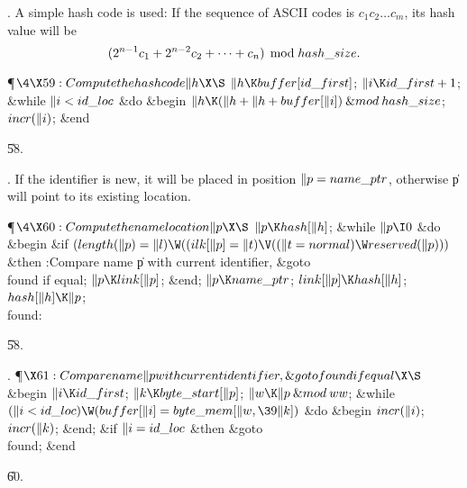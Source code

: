 . A simple hash code is used: If the sequence of
ASCII codes is $c_1c_2\ldots c_m$, its hash value will be
$$(2^{n-1}c_1+2^{n-2}c_2+\cdots+c_n)\,\bmod\,\\{hash\_size}.$$

\Y\P$\4\X59:Compute the hash code \|h\X\S$\6
$\|h\K\\{buffer}[\\{id\_first}]$;\5
$\|i\K\\{id\_first}+1$;\6
\&{while} $\|i<\\{id\_loc}$ \1\&{do}\6
\&{begin} $\|h\K(\|h+\|h+\\{buffer}[\|i])\mathbin{\&{mod}}\\{hash\_size}$;\5
$\\{incr}(\|i)$;\6
\&{end}\2\par
\U58.\fi

. If the identifier is new, it will be placed in position $\|p=\\{name%
\_ptr}$,
otherwise \|p will point to its existing location.

\Y\P$\4\X60:Compute the name location \|p\X\S$\6
$\|p\K\\{hash}[\|h]$;\6
\&{while} $\|p\I0$ \1\&{do}\6
\&{begin} \&{if} $(\\{length}(\|p)=\|l)\W((\\{ilk}[\|p]=\|t)\V((\|t=%
\\{normal})\W\\{reserved}(\|p)))$ \1\&{then}\5
:Compare name \|p with current identifier, \&{goto} \\{found} if equal\X;\2%
\6
$\|p\K\\{link}[\|p]$;\6
\&{end};\2\6
$\|p\K\\{name\_ptr}$;\6
$\\{link}[\|p]\K\\{hash}[\|h]$;\5
$\\{hash}[\|h]\K\|p$;\6
\4\\{found}: \par
\U58.\fi

. \P$\X61:Compare name \|p with current identifier, \&{goto} \\{found} if
equal\X\S$\6
\&{begin} $\|i\K\\{id\_first}$;\5
$\|k\K\\{byte\_start}[\|p]$;\5
$\|w\K\|p\mathbin{\&{mod}}\\{ww}$;\6
\&{while} $(\|i<\\{id\_loc})\W(\\{buffer}[\|i]=\\{byte\_mem}[\|w,\39\|k])$ \1%
\&{do}\6
\&{begin} $\\{incr}(\|i)$;\5
$\\{incr}(\|k)$;\6
\&{end};\2\6
\&{if} $\|i=\\{id\_loc}$ \1\&{then}\5
\&{goto} \\{found};\2\6
\&{end}\par
\U60.\fi

